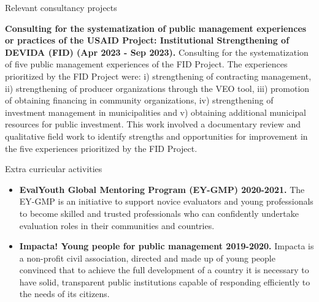 \documentclass{resume} %
\begin{document}
\begin{rSection}{Relevant consultancy projects}
\item \textbf{Consulting for the systematization of public management experiences or practices of the USAID Project: Institutional Strengthening of DEVIDA (FID) (Apr 2023 - Sep 2023).} {Consulting for the systematization of five public management experiences of the FID Project. The experiences prioritized by the FID Project were: i) strengthening of contracting management, ii) strengthening of producer organizations through the VEO tool, iii) promotion of obtaining financing in community organizations, iv) strengthening of investment management in municipalities and v) obtaining additional municipal resources for public investment. This work involved a documentary review and qualitative field work to identify strengths and opportunities for improvement in the five experiences prioritized by the FID Project.}
\end{rSection} 

\begin{rSection}{Extra curricular activities} 
\begin{itemize}
   \item 	\textbf{EvalYouth Global Mentoring Program (EY-GMP) 2020-2021.} {The EY-GMP is an initiative to support novice evaluators and young professionals to become skilled and trusted professionals who can confidently undertake evaluation roles in their communities and countries.}
   \item 	\textbf{Impacta! Young people for public management 2019-2020.} {Impacta is a non-profit civil association, directed and made up of young people convinced that to achieve the full development of a country it is necessary to have solid, transparent public institutions capable of responding efficiently to the needs of its citizens.}
  \end{itemize}

\end{rSection}

   
\end{document}
